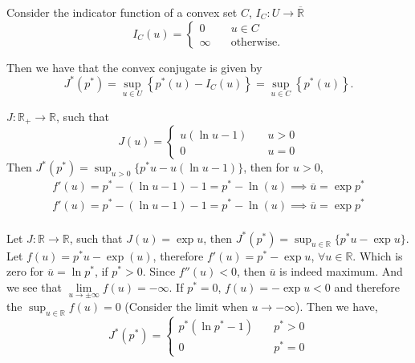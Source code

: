 \begin{example}
	Consider the indicator function of a convex set $C$, $I_C: U\rightarrow\overline{\mathbb{R}}$
	\[
	I_C(u)=
	\left\lbrace
	\begin{array}{cl}
	0&\quad u \in C\\
	\infty & \quad \text{otherwise}.
	\end{array}
	\right.
	\]
	
	Then we have that the convex conjugate is given by
	\[J^*(p^*)=\sup_{u\in U}\left\lbrace p^*(u)-I_C(u)\right\rbrace=\sup_{u\in C}\left\lbrace p^*(u)\right\rbrace.\]
\end{example}
\begin{example}
	$J: \mathbb{R}_+\rightarrow \mathbb{R}$, such that
	\begin{equation*}
	J(u)=\left\lbrace
	\begin{array}{ll}
		u(\ln u -1) & \quad u >0 \\
		0 & \quad u =0
	\end{array}		
	\right.
	\end{equation*}
	Then $J^*(p^*)=\sup_{u>0} \{p^*u-u(\ln u -1)\}$, then for $u>0$,
	\begin{align*}
		f'(u)=p^*-(\ln u -1) -1 = p^* -\ln(u) \implies \overline{u}=\exp p^* \\
		f'(u)=p^*-(\ln u -1) -1 = p^* -\ln(u) \implies \overline{u}=\exp p^* \\
	\end{align*}
\end{example}
\begin{example}
	Let $J:\mathbb{R}\rightarrow \mathbb{R}$, such that $J(u)=\exp u$, then $J^*(p^*)=\sup_{u\in \mathbb{R}} \lbrace p^*u -\exp u\rbrace$. Let $f(u)=p^*u-\exp(u)$, therefore $f'(u)=p^*-\exp u$, $\forall u \in \mathbb{R}$. Which is zero for $\overline{u} = \ln p^*$, if $p^*>0$. Since $f''(u)<0$, then $\overline{u}$ is indeed maximum. And we see that $\lim\limits_{u\rightarrow \pm \infty} f(u)=-\infty$. If $p^*=0$, $f(u)=-\exp u < 0$ and therefore the $\sup_{u \in \mathbb{R}} f(u)=0$ (Consider the limit when $u \rightarrow -\infty$). Then we have,
	\begin{equation*}
		J^*(p^*)=\left\lbrace 
		\begin{array}{cr}
			p^*(\ln p^*-1) & \quad p^*>0 \\
			0 & \quad p^*=0
		\end{array}		
		\right.
	\end{equation*}	
\end{example}
